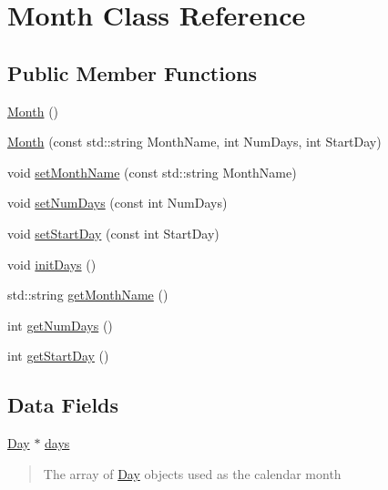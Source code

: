 \hypertarget{classMonth}{\section{Month Class Reference}
\label{classMonth}
}
\subsection*{Public Member Functions}
\begin{DoxyCompactItemize}
\item 
\hyperlink{classMonth_a36882c55ece9c4210ec1b01bd665ec89}{Month} ()
\item 
\hyperlink{classMonth_ae2b064f3abf4c38a9e2527920831ed3f}{Month} (const std\-::string Month\-Name, int Num\-Days, int Start\-Day)
\item 
void \hyperlink{classMonth_a77dee92af5de872d8579b1b142473f90}{set\-Month\-Name} (const std\-::string Month\-Name)
\item 
void \hyperlink{classMonth_a661a751213b495884ec258d3e6c687e9}{set\-Num\-Days} (const int Num\-Days)
\item 
void \hyperlink{classMonth_ae9730715451148a5a4629b9c450e8103}{set\-Start\-Day} (const int Start\-Day)
\item 
void \hyperlink{classMonth_a9309f01ffc97e5bbb13bf8f5801f2aec}{init\-Days} ()
\item 
std\-::string \hyperlink{classMonth_a1cb2ba2c0e646b961f55d99e9f5b74de}{get\-Month\-Name} ()
\item 
int \hyperlink{classMonth_a5ab8e306d9f603872dcf68b7bc771aa0}{get\-Num\-Days} ()
\item 
int \hyperlink{classMonth_a5fd5d2bf55df35f09262198e416e1906}{get\-Start\-Day} ()
\end{DoxyCompactItemize}
\subsection*{Data Fields}
\begin{DoxyCompactItemize}
\item 
\hypertarget{classMonth_a8ade9e4309247818f04ce3e7f7682d6f}{\hyperlink{classDay}{Day} $\ast$ \hyperlink{classMonth_a8ade9e4309247818f04ce3e7f7682d6f}{days}}\label{classMonth_a8ade9e4309247818f04ce3e7f7682d6f}

\begin{DoxyCompactList}\small\item\em \begin{quotation}
The array of \hyperlink{classDay}{Day} objects used as the calendar month \end{quotation}
\end{DoxyCompactList}\end{DoxyCompactItemize}


